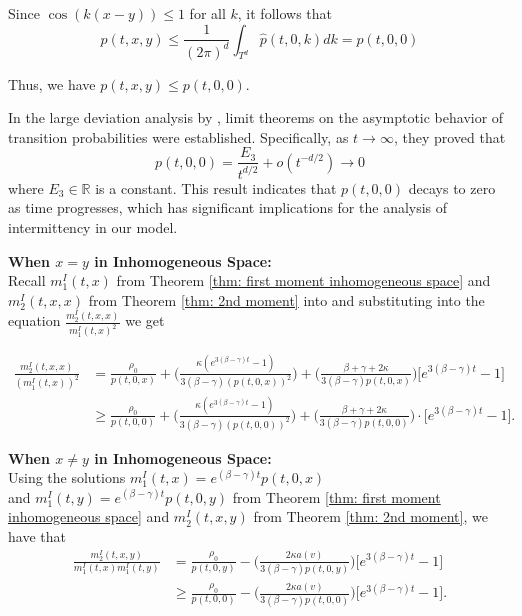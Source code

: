 \documentclass[sn-basic]{sn-jnl}%
\theoremstyle{thmstyleone}%
\theoremstyle{thmstyletwo}%
\theoremstyle{thmstylethree}%
\numberwithin{equation}{theorem}
\begin{document}
Since $\cos (k(x-y)) \leq 1$ for all $k$, it follows that
$$
p(t, x, y) \leq \frac{1}{(2 \pi)^d} \int_{T^d} \hat{p}(t, 0, k) d k=p(t, 0,0)
$$

Thus, we have $p(t, x, y) \leq p(t, 0,0)$.

In the large deviation analysis by \citep{19}, limit theorems on the asymptotic behavior of transition probabilities were established. Specifically, as $t \rightarrow \infty$, they proved that
$$
p(t, 0,0)=\frac{E_3}{t^{d / 2}}+o\left(t^{-d / 2}\right) \rightarrow 0
$$
where $E_3 \in \mathbb{R}$ is a constant. This result indicates that $p(t, 0,0)$ decays to zero as time progresses, which has significant implications for the analysis of intermittency in our model.

\textbf{When $x=y$ in Inhomogeneous Space:}\\
Recall $m_{1}^{I}(t,x)$ from Theorem \ref{thm: first moment inhomogeneous space} and $m_{2}^{I}(t,x,x)$ from Theorem \ref{thm: 2nd moment} into and substituting into the equation $\displaystyle \frac{m_{2}^{I}(t,x,x)}{m_{1}^{I}(t,x)^2}$ we get
\begin{center}
\begin{align*}
\displaystyle \frac{m_{2}^{I}(t,x,x)}{(m_{1}^{I}(t,x))^{2}} &=
\frac{\rho_{0}}{p(t,0,x)} + \Big(\frac{\kappa (e^{ 3(\beta-\gamma)t}-1)}{3(\beta-\gamma)(p(t,0,x))^{2}}\Big) + \Big( \frac{\beta+\gamma+2\kappa}{3(\beta-\gamma)p(t,0,x)}\Big)\Big[e^{ 3(\beta-\gamma)t} -1 \Big]\\
& \ge
\frac{\rho_{0}}{p(t,0,0)} + \Big(\frac{\kappa(e^{ 3(\beta-\gamma)t}-1)}{3(\beta-\gamma)(p(t,0,0))^{2}}\Big)  + \Big( \frac{\beta+\gamma+2\kappa}{3(\beta-\gamma)p(t,0,0)}\Big) \cdot
\Big[e^{ 3(\beta-\gamma)t} -1 \Big].
\end{align*}
\end{center}

\textbf{When $x \neq y$ in Inhomogeneous Space:}\\
Using the solutions $m_{1}^{I}(t,x) = e^{\displaystyle (\beta-\gamma)t} p(t,0,x)$\\ and $m_{1}^{I}(t,y) = e^{\displaystyle (\beta-\gamma)t} p(t,0,y)$ from Theorem \ref{thm: first moment inhomogeneous space} and $m_{2}^{I}(t,x,y)$ from Theorem \ref{thm: 2nd moment}, we have that
\begin{align*}
\displaystyle \frac{m_{2}^{I}(t,x,y)}{m_{1}^{I}(t,x)m_{1}^{I}(t,y)}& = \displaystyle \frac{\rho_{0}}{p(t,0,y)} - \displaystyle \Big(\frac{2\kappa a(v)}{3(\beta-\gamma)p(t,0,y)}\Big) \Big[e^{\displaystyle 3(\beta-\gamma)t}-1 \Big] \\
&\geq \displaystyle \frac{\rho_{0}}{p(t,0,0)} - \displaystyle \Big(\frac{2\kappa a(v)}{3(\beta-\gamma)p(t,0,0)}\Big) \Big[e^{\displaystyle 3(\beta-\gamma)t}-1 \Big].
\end{align*}
\end{document}
